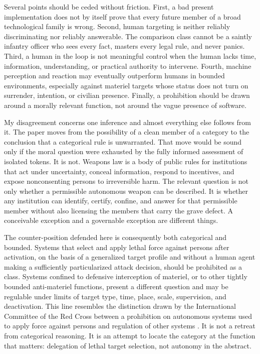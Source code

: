 \documentclass[11pt]{article}
\begin{document}
Several points should be ceded without friction. First, a bad present implementation does not by itself prove that every future member of a broad technological family is wrong. Second, human targeting is neither reliably discriminating nor reliably answerable. The comparison class cannot be a saintly infantry officer who sees every fact, masters every legal rule, and never panics. Third, a human in the loop is not meaningful control when the human lacks time, information, understanding, or practical authority to intervene. Fourth, machine perception and reaction may eventually outperform humans in bounded environments, especially against materiel targets whose status does not turn on surrender, intention, or civilian presence. Finally, a prohibition should be drawn around a morally relevant function, not around the vague presence of software.

My disagreement concerns one inference and almost everything else follows from it. The paper moves from the possibility of a clean member of a category to the conclusion that a categorical rule is unwarranted. That move would be sound only if the moral question were exhausted by the fully informed assessment of isolated tokens. It is not. Weapons law is a body of public rules for institutions that act under uncertainty, conceal information, respond to incentives, and expose nonconsenting persons to irreversible harm. The relevant question is not only whether a permissible autonomous weapon can be described. It is whether any institution can identify, certify, confine, and answer for that permissible member without also licensing the members that carry the grave defect. A conceivable exception and a governable exception are different things.

The counter-position defended here is consequently both categorical and bounded. Systems that select and apply lethal force against persons after activation, on the basis of a generalized target profile and without a human agent making a sufficiently particularized attack decision, should be prohibited as a class. Systems confined to defensive interception of materiel, or to other tightly bounded anti-materiel functions, present a different question and may be regulable under limits of target type, time, place, scale, supervision, and deactivation. This line resembles the distinction drawn by the International Committee of the Red Cross between a prohibition on autonomous systems used to apply force against persons and regulation of other systems \citep{icrc2021}. It is not a retreat from categorical reasoning. It is an attempt to locate the category at the function that matters: delegation of lethal target selection, not autonomy in the abstract.
\end{document}
